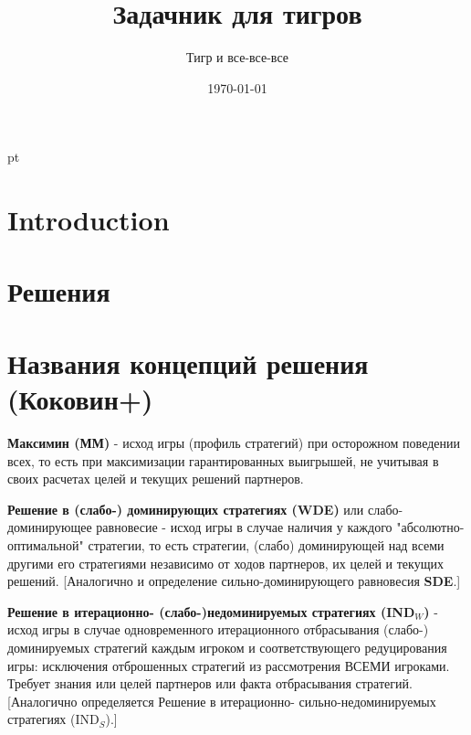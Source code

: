 \documentclass[12pt, a4paper]{article}
\title{Задачник для тигров}
\author{Тигр и все-все-все}
\date{\today}
\theoremstyle{exersize}
\numberwithin{problem}{section}
\begin{document}
\pagestyle{myheadings} 

\nocite{winkler:gpdp} \nocite{colell:mt} \nocite{binmore:fg}
\nocite{ilf:12} \nocite{kino:mind} \nocite{jowas:incorrect} \nocite{redondo:etg} \nocite{sekei:paradox}
\nocite{polisci:lectures} \nocite{cramton:lectures} \nocite{mti:lectures} \nocite{kockesen:lectures} \nocite{brams:dps} \nocite{squintani:nncgt} \nocite{zade:rn} \nocite{osborne:igt} \nocite{osborne:cgt} \nocite{miller:gtw} \nocite{gintis:gte} \nocite{danilov:lte} \nocite{gt.net}

\maketitle
\tableofcontents{}

 pt %

\section{Introduction}






\section{Решения}



\section{Названия концепций решения (Коковин+)}
\textbf{Максимин (ММ)} - исход игры (профиль
стратегий) при осторожном поведении всех, то есть
при максимизации гарантированных выигрышей, не
учитывая в своих расчетах целей и текущих решений
партнеров.\vspace{2mm}

\textbf{Решение в (слабо-) доминирующих стратегиях
(WDE)} или слабо-доминирующее равновесие - исход
игры в случае наличия у каждого
"абсолютно-оптимальной" стратегии, то есть
стратегии, (слабо) доминирующей над всеми другими
его стратегиями независимо от ходов партнеров, их
целей и текущих решений. [Аналогично и определение
сильно-доминирующего равновесия
\textbf{SDE}.]\vspace{2mm}

\textbf{Решение в итерационно-
(слабо-)недоминируемых стратегиях (IND${}_W$)} -
исход игры в случае одновременного итерационного
отбрасывания (слабо-) доминируемых стратегий каждым
игроком и соответствующего редуцирования игры:
исключения отброшенных стратегий из рассмотрения
ВСЕМИ игроками. Требует знания или целей партнеров
или факта отбрасывания стратегий. [Аналогично
определяется Решение в итерационно-
сильно-недоминируемых стратегиях
(IND${}_S$).]\vspace{2mm}
\end{document}
